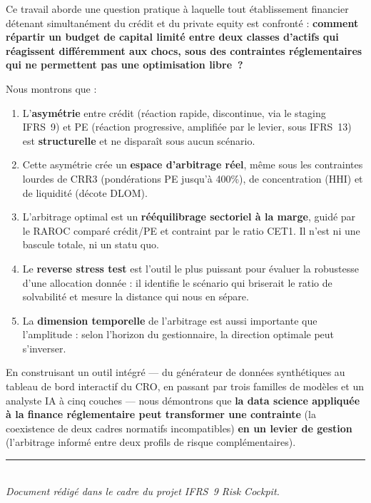 \documentclass[12pt,a4paper]{article}
\begin{document}
\begin{conclusion}
Ce travail aborde une question pratique à laquelle tout établissement financier détenant simultanément du crédit et du private equity est confronté : \textbf{comment répartir un budget de capital limité entre deux classes d'actifs qui réagissent différemment aux chocs, sous des contraintes réglementaires qui ne permettent pas une optimisation libre~?}

\vspace{0.5em}

Nous montrons que :

\begin{enumerate}
  \item L'\textbf{asymétrie} entre crédit (réaction rapide, discontinue, via le staging IFRS~9) et PE (réaction progressive, amplifiée par le levier, sous IFRS~13) est \textbf{structurelle} et ne disparaît sous aucun scénario.

  \item Cette asymétrie crée un \textbf{espace d'arbitrage réel}, même sous les contraintes lourdes de CRR3 (pondérations PE jusqu'à 400\%), de concentration (HHI) et de liquidité (décote DLOM).

  \item L'arbitrage optimal est un \textbf{rééquilibrage sectoriel à la marge}, guidé par le RAROC comparé crédit/PE et contraint par le ratio CET1. Il n'est ni une bascule totale, ni un statu quo.

  \item Le \textbf{reverse stress test} est l'outil le plus puissant pour évaluer la robustesse d'une allocation donnée : il identifie le scénario qui briserait le ratio de solvabilité et mesure la distance qui nous en sépare.

  \item La \textbf{dimension temporelle} de l'arbitrage est aussi importante que l'amplitude : selon l'horizon du gestionnaire, la direction optimale peut s'inverser.
\end{enumerate}

\vspace{0.5em}

En construisant un outil intégré --- du générateur de données synthétiques au tableau de bord interactif du CRO, en passant par trois familles de modèles et un analyste IA à cinq couches --- nous démontrons que \textbf{la data science appliquée à la finance réglementaire peut transformer une contrainte} (la coexistence de deux cadres normatifs incompatibles) \textbf{en un levier de gestion} (l'arbitrage informé entre deux profils de risque complémentaires).
\end{conclusion}

\vfill
\begin{center}
\rule{0.4\textwidth}{0.4pt}\\[0.5em]
{\small\textit{Document rédigé dans le cadre du projet IFRS~9 Risk Cockpit.}}
\end{center}
\end{document}
